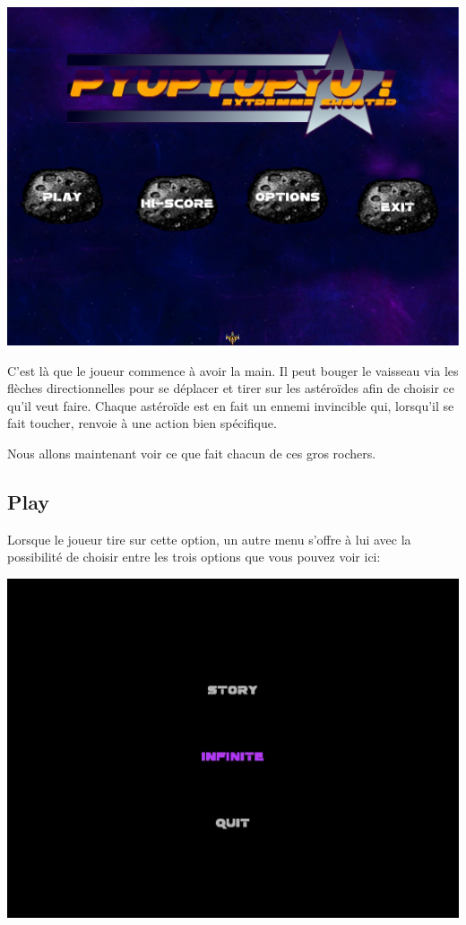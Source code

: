 \documentclass{article}
\begin{document}
\begin{center}
\includegraphics[scale=0.5]{images/menuprinc.jpg}
\end{center}

C'est là que le joueur commence à avoir la main. Il peut bouger le vaisseau via les flèches directionnelles pour se déplacer et tirer sur les astéroïdes afin de choisir ce qu'il veut faire. Chaque astéroïde est en fait un ennemi invincible qui, lorsqu'il se fait toucher, renvoie à une action bien spécifique.

Nous allons maintenant voir ce que fait chacun de ces gros rochers. 

\subsection{Play}

Lorsque le joueur tire sur cette option, un autre menu s'offre à lui avec la possibilité de choisir entre les trois options que vous pouvez voir ici:

\begin{center}
\includegraphics[scale=0.5]{images/sousmenu.jpg}
\end{center}
\end{document}
